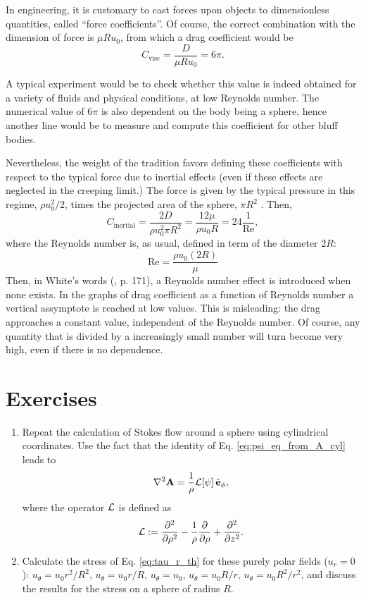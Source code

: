 In engineering, it is customary to cast forces upon objects to
dimensionless quantities, called ``force coefficients''.  Of course, the correct combination with the dimension
of force is $\mu R u_0$, from which a drag coefficient would be
\[
  C_\mathrm{visc} = \frac{ D }{ \mu R u_0 } = 6\pi .
\]

A typical experiment would be to check whether this value is indeed
obtained for a variety of fluids and physical conditions, at low
Reynolds number. The numerical value of $6\pi$ is also dependent
on the body being a sphere, hence another line would be to measure
and compute this coefficient for other bluff bodies.

Nevertheless, the weight of the tradition favors defining these
coefficients with respect to the typical force due to inertial effects
(even if these effects are neglected in the creeping limit.) The force
is given by the typical pressure in this regime, $\rho u_0^2 / 2 $,
times the projected area of the sphere, $\pi R^2$ . Then,
\[
  C_\mathrm{inertial} = \frac{  2 D }{ \rho u_0^2 \pi R^2 } =
  \frac{  12 \mu  }{ \rho u_0 R }   =
  24 \frac{1}{\mathrm{Re}} ,
\]
where the Reynolds number is, as usual, defined in term of the
diameter $2R$:
\[
  \mathrm{Re} = \frac{ \rho u_0 ( 2 R ) }{ \mu } 
\]
Then, in White's words (\cite{white1991viscous}, p. 171), a Reynolds
number effect is introduced when none exists. In the graphs of drag
coefficient as a function of Reynolds number a vertical assymptote is
reached at low values. This is misleading: the drag approaches a
constant value, independent of the Reynolds number. Of course, any
quantity that is divided by a increasingly small number will turn
become very high, even if there is no dependence.


\section{Exercises}


\begin{enumerate}

\item Repeat the calculation of Stokes flow around a sphere using
  cylindrical coordinates. Use the fact that the identity of
  Eq. \ref{eq:psi_eq_from_A_cyl} leads to
  \begin{equation*}
    \nabla^2 \mathbf{A} = \frac{1}{\rho } {\cal L} [\psi] \, \hat{\mathbf{e}}_\phi ,
  \end{equation*}
  where the operator $\cal L$ is defined as
  \[
    {\cal L} :=
    \frac{\partial^2  }{\partial \rho^2} -
    \frac{1}{ \rho } 
    \frac{\partial  }{\partial \rho} +
    \frac{\partial^2  }{\partial z^2}.
  \]
\item \label{ex:tau_r_th} Calculate the stress of
  Eq. \ref{eq:tau_r_th} for these purely polar fields ($u_r=0$):
  $u_\theta = u_0 r^2/R^2$,
  $u_\theta = u_0 r / R$,
  $u_\theta = u_0$,
  $u_\theta = u_0 R/r$,
  $u_\theta = u_0 R^2/r^2$,
  and discuss the results for the stress on a sphere of radius $R$.

\end{enumerate}